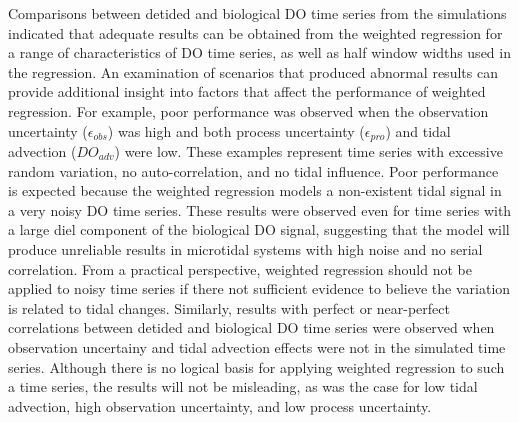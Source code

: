 \documentclass[letterpaper,12pt,oneside]{article}\usepackage[]{graphicx}\usepackage[]{color}
\begin{document}
Comparisons between detided and biological \ac{DO} time series from the simulations indicated that adequate results can be obtained from the weighted regression for a range of characteristics of \ac{DO} time series, as well as half window widths used in the regression.  An examination of scenarios that produced abnormal results can provide additional insight into factors that affect the performance of weighted regression.  For example, poor performance was observed when the observation uncertainty ($\epsilon_{obs}$) was high and both process uncertainty ($\epsilon_{pro}$) and tidal advection ($DO_{adv}$) were low.  These examples represent time series with excessive random variation, no auto-correlation, and no tidal influence.  Poor performance is expected because the weighted regression models a non-existent tidal signal in a very noisy \ac{DO} time series.  These results were observed even for time series with a large diel component of the biological \ac{DO} signal, suggesting that the model will produce unreliable results in microtidal systems with high noise and no serial correlation.  From a practical perspective, weighted regression should not be applied to noisy time series if there not sufficient evidence to believe the variation is related to tidal changes.  Similarly, results with perfect or near-perfect correlations between detided and biological \ac{DO} time series were observed when observation uncertainy and tidal advection effects were not in the simulated time series.  Although there is no logical basis for applying weighted regression to such a time series, the results will not be misleading, as was the case for low tidal advection, high observation uncertainty, and low process uncertainty.  
\end{document}
